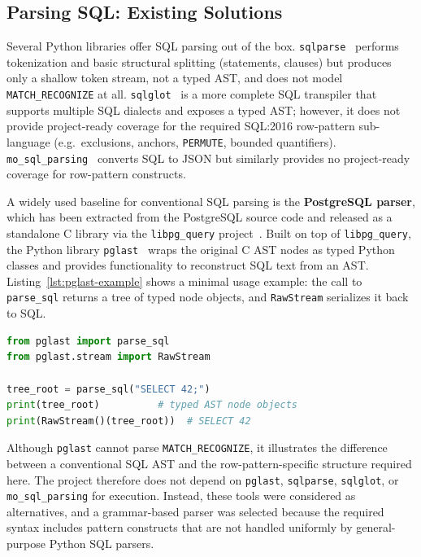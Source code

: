 \subsection{Parsing SQL: Existing Solutions}
\label{subsec:meth-existing-parsers}

Several Python libraries offer SQL parsing out of the box.
\texttt{sqlparse}~\cite{sqlparse_tool} performs tokenization and basic structural
splitting (statements, clauses) but produces only a shallow token
stream, not a typed AST, and does not model \texttt{MATCH\_RECOGNIZE}
at all.  \texttt{sqlglot}~\cite{sqlglot_tool} is a more complete SQL transpiler that
supports multiple SQL dialects and exposes a typed AST; however,
it does not provide project-ready coverage for the required
SQL:2016 row-pattern sub-language (e.g.\ exclusions, anchors,
\texttt{PERMUTE}, bounded quantifiers).  \texttt{mo\_sql\_parsing}~\cite{mo_sql_parsing_tool}
converts SQL to JSON but similarly provides no project-ready
coverage for row-pattern constructs.

A widely used baseline for conventional SQL parsing is the
\textbf{PostgreSQL parser}, which has been extracted from the
PostgreSQL source code and released as a standalone C library via
the \texttt{libpg\_query} project~\cite{libpg_query_tool}.  Built on top of
\texttt{libpg\_query}, the Python library \texttt{pglast}~\cite{pglast_tool} wraps the
original C AST nodes as typed Python classes and provides
functionality to reconstruct SQL text from an AST.
Listing~\ref{lst:pglast-example} shows a minimal usage example:
the call to \texttt{parse\_sql} returns a tree of typed node
objects, and \texttt{RawStream} serializes it back to SQL.

\begin{lstlisting}[language=Python,
    caption={Parsing a SQL statement with \texttt{pglast} and
             reconstructing SQL text},
    label={lst:pglast-example}]
from pglast import parse_sql
from pglast.stream import RawStream

tree_root = parse_sql("SELECT 42;")
print(tree_root)          # typed AST node objects
print(RawStream()(tree_root))  # SELECT 42
\end{lstlisting}

Although \texttt{pglast} cannot parse \texttt{MATCH\_RECOGNIZE}, it
illustrates the difference between a conventional SQL AST and the
row-pattern-specific structure required here.  The project therefore
does not depend on \texttt{pglast}, \texttt{sqlparse},
\texttt{sqlglot}, or \texttt{mo\_sql\_parsing} for execution.
Instead, these tools were considered as alternatives, and a
grammar-based parser was selected because the required syntax
includes pattern constructs that are not handled uniformly by
general-purpose Python SQL parsers.

